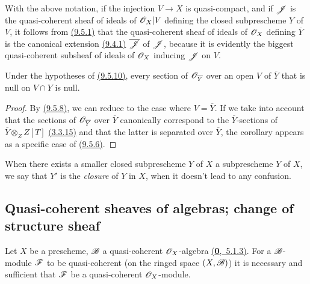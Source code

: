 With the above notation, if the injection $V\to X$ is quasi-compact, and if $\mathscr{J}$ is the quasi-coherent sheaf of ideals of $\mathscr{O}_X|V$ defining the closed subprescheme $Y$ of $V$, it follows from \hyperref[prop-1.9.5.1]{(9.5.1)} that the quasi-coherent sheaf of ideals of $\mathscr{O}_X$ defining $\overline{Y}$ is the canonical extension \hyperref[env-1.9.4.1]{(9.4.1)} $\overline{\mathscr{J}}$ of $\mathscr{J}$, because it is evidently the biggest quasi-coherent subsheaf of ideals of $\mathscr{O}_X$ inducing $\mathscr{J}$ on $V$.

\begin{cor}[9.5.11]
\label{cor-1.9.5.11}
Under the hypotheses of \hyperref[prop-1.9.5.10]{(9.5.10)}, every section of $\mathscr{O}_{\overline{Y}}$ over an open $V$ of $\overline{Y}$ that is null on $V\cap Y$ is null.
\end{cor}

\begin{proof}
\label{proof-cor-1.9.5.11}
By \hyperref[prop-1.9.5.8]{(9.5.8)}, we can reduce to the case where $V=\overline{Y}$.
If we take into account that the sections of $\mathscr{O}_{\overline{Y}}$ over $\overline{Y}$ canonically correspond to the $\overline{Y}$-sections of $\overline{Y}\otimes_Z Z[T]$ \hyperref[env-1.3.3.15]{(3.3.15)} and that the latter is separated over $\overline{Y}$, the corollary appears as a specific case of \hyperref[cor-1.9.5.6]{(9.5.6)}.
\end{proof}

When there exists a smaller closed subprescheme $Y$ of $X$  a subprescheme $Y$ of $X$, we say that $Y'$ is the {\em closure} of $Y$ in $X$, when it doesn't lead to any confusion.

\subsection{Quasi-coherent sheaves of algebras; change of structure sheaf}
\label{subsection-qcoh-algs-and-change-of-str-sheaf}

\begin{prop}[9.6.1]
\label{prop-1.9.6.1}
Let $X$ be a prescheme, $\mathscr{B}$ a quasi-coherent $\mathscr{O}_X$-algebra \hyperref[env-0.5.1.3]{(\textbf{0},~5.1.3)}.
For a $\mathscr{B}$-module $\mathscr{F}$ to be quasi-coherent (on the ringed space $(X,\mathscr{B})$) it is necessary and sufficient that $\mathscr{F}$ be a quasi-coherent $\mathscr{O}_X$-module.
\end{prop}

